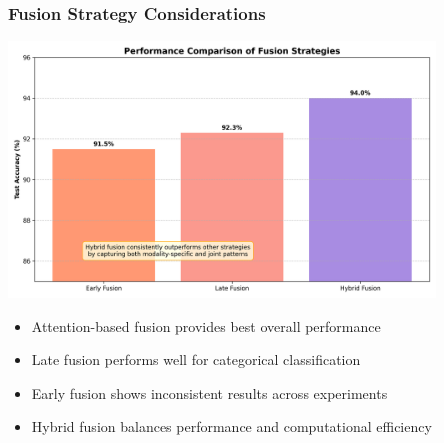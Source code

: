 \begin{frame}
\frametitle{Fusion Strategy Considerations}
\begin{center}
\includegraphics[width=0.85\textwidth]{figures/fusion_performance.png}
\end{center}

\begin{itemize}
    \item Attention-based fusion provides best overall performance
    \item Late fusion performs well for categorical classification
    \item Early fusion shows inconsistent results across experiments
    \item Hybrid fusion balances performance and computational efficiency
\end{itemize}
\end{frame}

